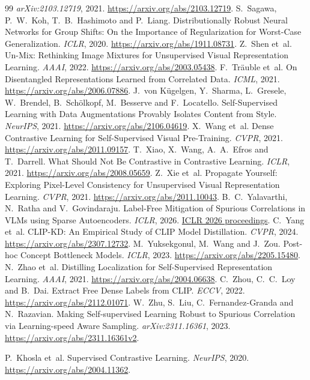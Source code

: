 \documentclass{article}
\begin{document}
\begin{thebibliography}{99}
\emph{arXiv:2103.12719}, 2021. \url{https://arxiv.org/abs/2103.12719}.
S.~Sagawa, P.~W.~Koh, T.~B.~Hashimoto and P.~Liang.
Distributionally Robust Neural Networks for Group Shifts: On the Importance
of Regularization for Worst-Case Generalization.
\emph{ICLR}, 2020. \url{https://arxiv.org/abs/1911.08731}.
Z.~Shen et~al.
Un-Mix: Rethinking Image Mixtures for Unsupervised Visual Representation Learning.
\emph{AAAI}, 2022. \url{https://arxiv.org/abs/2003.05438}.
F.~Tr\"auble et~al.
On Disentangled Representations Learned from Correlated Data.
\emph{ICML}, 2021. \url{https://arxiv.org/abs/2006.07886}.
J.~von K\"ugelgen, Y.~Sharma, L.~Gresele, W.~Brendel, B.~Sch\"olkopf, M.~Besserve and F.~Locatello.
Self-Supervised Learning with Data Augmentations Provably Isolates Content from Style.
\emph{NeurIPS}, 2021. \url{https://arxiv.org/abs/2106.04619}.
X.~Wang et~al.
Dense Contrastive Learning for Self-Supervised Visual Pre-Training. \emph{CVPR}, 2021.
\url{https://arxiv.org/abs/2011.09157}.
T.~Xiao, X.~Wang, A.~A.~Efros and T.~Darrell.
What Should Not Be Contrastive in Contrastive Learning. \emph{ICLR}, 2021.
\url{https://arxiv.org/abs/2008.05659}.
Z.~Xie et~al.
Propagate Yourself: Exploring Pixel-Level Consistency for Unsupervised Visual Representation Learning.
\emph{CVPR}, 2021. \url{https://arxiv.org/abs/2011.10043}.
B.~C.~Yalavarthi, N.~Ratha and V.~Govindaraju.
Label-Free Mitigation of Spurious Correlations in VLMs using Sparse Autoencoders.
\emph{ICLR}, 2026.
\href{https://proceedings.iclr.cc/paper_files/paper/2026/hash/359242d225d2fba218a85e147803f8b7-Abstract-Conference.html}{ICLR 2026 proceedings}.
C.~Yang et~al.
CLIP-KD: An Empirical Study of CLIP Model Distillation. \emph{CVPR}, 2024.
\url{https://arxiv.org/abs/2307.12732}.
M.~Yuksekgonul, M.~Wang and J.~Zou.
Post-hoc Concept Bottleneck Models. \emph{ICLR}, 2023.
\url{https://arxiv.org/abs/2205.15480}.
N.~Zhao et~al.
Distilling Localization for Self-Supervised Representation Learning. \emph{AAAI}, 2021.
\url{https://arxiv.org/abs/2004.06638}.
C.~Zhou, C.~C.~Loy and B.~Dai.
Extract Free Dense Labels from CLIP. \emph{ECCV}, 2022.
\url{https://arxiv.org/abs/2112.01071}.
W.~Zhu, S.~Liu, C.~Fernandez-Granda and N.~Razavian.
Making Self-supervised Learning Robust to Spurious Correlation via
Learning-speed Aware Sampling. \emph{arXiv:2311.16361}, 2023.
\url{https://arxiv.org/abs/2311.16361v2}.

P.~Khosla et~al.
Supervised Contrastive Learning. \emph{NeurIPS}, 2020.
\url{https://arxiv.org/abs/2004.11362}.


\end{thebibliography}
\endgroup
\end{document}
